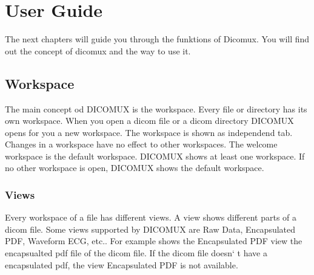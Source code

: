 %
%
\chapter{User Guide}
The next chapters will guide you through the funktions of Dicomux. You will find
out the concept of dicomux and the way to use it.

\section{Workspace}
	The main concept od DICOMUX is the workspace. Every file or directory has its
	own workspace. When you open a dicom file or a dicom directory DICOMUX opens for
	you a new workspace. The workspace is shown as independend tab. Changes in a
	workspace have no effect to other workspaces. The welcome workspace is the
	default workspace. DICOMUX shows at least one workspace. If no other workspace
	is open, DICOMUX shows the default workspace.\\
	
	\begin{minipage}{\textwidth}
	\centering
	\end{minipage}

	
	\subsection{Views}
	Every workspace of a file has different views. A view shows
	different parts of a dicom file.
	Some views supported by DICOMUX are Raw Data, Encapsulated PDF, Waveform ECG,
	etc.. For example shows the Encapsulated PDF view the encapsualted pdf file of
	the dicom file. If the dicom file doesn` t have a encapsulated pdf, the view
	Encapsulated PDF is not available.\\
	

